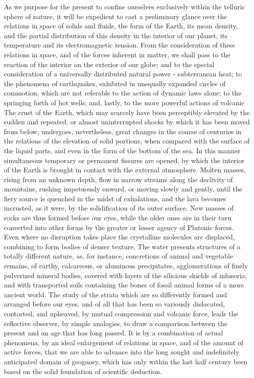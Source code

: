 As we purpose for the present to confine ourselves exclusively within the telluric sphere of nature, it will be expedient to cast a preliminary glance over the relations in space of solids and fluids, the form of the Earth, its mean density, and the partial distribution of this density in the interior of our planet, its temperature and its electromagnetic tension. From the consideration of these relations in space, and of the forces inherent in matter, we shall pass to the reaction of the interior on the exterior of our globe; and to the special consideration of a universally distributed natural power - subterranean heat; to the phenomena of earthquakes, exhibited in unequally expanded circles of commotion, which are not referable to the action of dynamic laws alone; to the springing forth of hot wells; and, lastly, to the more powerful actions of volcanic The crust of the Earth, which may scarcely have been perceptibly elevated by the sudden and repeated, or almost uninterrupted shocks by which it has been moved from below, undergoes, nevertheless, great changes in the course of centuries in the relations of the elevation of solid portions, when compared with the surface of the liquid parts, and even in the form of the bottom of the sea. In this manner simultaneous temporary or permanent fissures are opened, by which the interior of the Earth is brought in contact with the external atmosphere. Molten masses, rising from an unknown depth, flow in narrow streams along the declivity of mountains, rushing impetuously onward, or moving slowly and gently, until the fiery source is quenched in the midst of exhalations, and the lava becomes incrusted, as it were, by the solidification of its outer surface. New masses of rocks are thus formed before our eyes, while the older ones are in their turn converted into other forms by the greater or lesser agency of Plutonic forces. Even where no disruption takes place the crystalline molecules are displaced, combining to form bodies of denser texture. The water presents structures of a totally different nature, as, for instance, concretions of animal and vegetable remains, of earthy, calcareous, or aluminous precipitates, agglomerations of finely pulverized mineral bodies, covered with layers of the silicious shields of infusoria, and with transported soils containing the bones of fossil animal forms of a more ancient world. The study of the strata which are so differently formed and arranged before our eyes, and of all that has been so variously dislocated, contorted, and upheaved, by mutual compression and volcanic force, leads the reflective observer, by simple analogies, to draw a comparison between the present and an age that has long passed. It is by a combination of actual phenomena, by an ideal enlargement of relations in space, and of the amount of active forces, that we are able to advance into the long sought and indefinitely anticipated domain of geognosy, which has only within the last half century been based on the solid foundation of scientific deduction.


